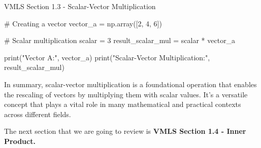 \begin{notes}{VMLS Section 1.3 - Scalar-Vector Multiplication}
\begin{highlight}
\begin{code}[Python]
    # Creating a vector
    vector_a = np.array([2, 4, 6])
    
    # Scalar multiplication
    scalar = 3
    result_scalar_mul = scalar * vector_a
    
    print("Vector A:", vector_a)
    print("Scalar-Vector Multiplication:", result_scalar_mul)
    \end{code}
    \end{highlight}

    In summary, scalar-vector multiplication is a foundational operation that enables the rescaling of vectors by multiplying them with scalar values. It's a versatile concept that plays a vital role in many mathematical 
    and practical contexts across different fields.
\end{notes}

The next section that we are going to review is \textbf{VMLS Section 1.4 - Inner Product.}

